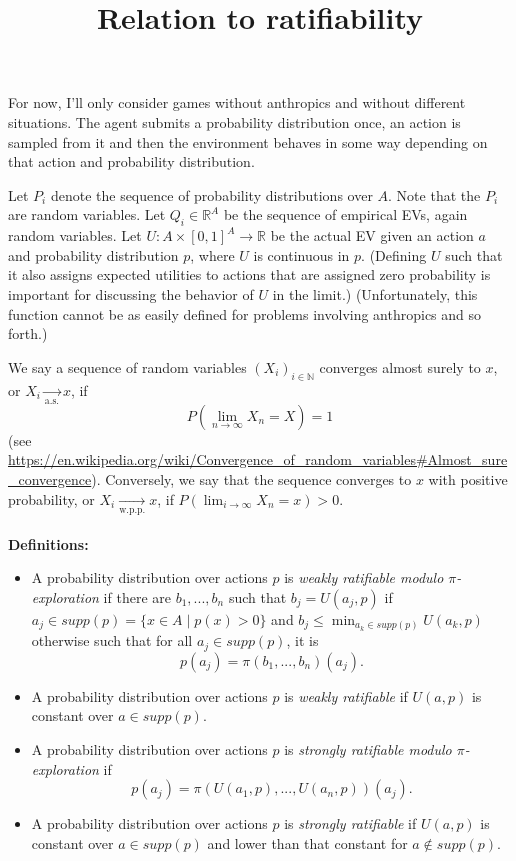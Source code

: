 \documentclass{article}
\title{Relation to ratifiability}
\begin{document}
\maketitle

For now, I'll only consider games without anthropics and without different situations. The agent submits a probability distribution once, an action is sampled from it and then the environment behaves in some way depending on that action and probability distribution.

Let $P_i$ denote the sequence of probability distributions over $A$. Note that the $P_i$ are random variables. Let $Q_i\in \mathbb{R}^A$ be the sequence of empirical EVs, again random variables. Let $U:A\times \left[0,1 \right]^A \rightarrow \mathbb{R}$ be the actual EV given an action $a$ and probability distribution $p$, where $U$ is continuous in $p$. (Defining $U$ such that it also assigns expected utilities to actions that are assigned zero probability is important for discussing the behavior of $U$ in the limit.) (Unfortunately, this function cannot be as easily defined for problems involving anthropics and so forth.)

We say a sequence of random variables $(X_i)_{i\in\mathbb{N}}$ converges almost surely to $x$, or $X_i\underset{\text{a.s.}}{\rightarrow} x$, if
\begin{equation}
P(\lim_{n\rightarrow \infty} X_n = X) = 1
\end{equation}
(see \url{https://en.wikipedia.org/wiki/Convergence_of_random_variables#Almost_sure_convergence}). Conversely, we say that the sequence converges to $x$ with positive probability, or $X_i\underset{\text{w.p.p.}}{\rightarrow} x$, if $P(\lim_{i\rightarrow \infty } X_n = x)>0$.
\\\\
\textbf{Definitions:}
\begin{itemize}
\item A probability distribution over actions $p$ is \textit{weakly ratifiable modulo $\pi$-exploration} if there are $b_1,...,b_n$ such that $b_j=U(a_j,p)$ if $a_j\in supp (p)=\{x\in A\mid p(x)>0 \}$ and $b_j\leq\min_{a_k\in supp (p) } U(a_k,p)$ otherwise such that for all $a_j\in supp (p)$, it is
\begin{equation}
p(a_j)=\pi (b_1,...,b_n) (a_j).
\end{equation}
\item A probability distribution over actions $p$ is \textit{weakly ratifiable} if $U(a,p)$ is constant over $a\in supp(p)$.
\item A probability distribution over actions $p$ is \textit{strongly ratifiable modulo $\pi$-exploration} if
\begin{equation}
p(a_j)=\pi (U(a_1,p),...,U(a_n,p)) (a_j).
\end{equation}
\item A probability distribution over actions $p$ is \textit{strongly ratifiable} if $U(a,p)$ is constant over $a\in supp(p)$ and lower than that constant for $a\notin supp(p)$.
\end{itemize}
\end{document}
